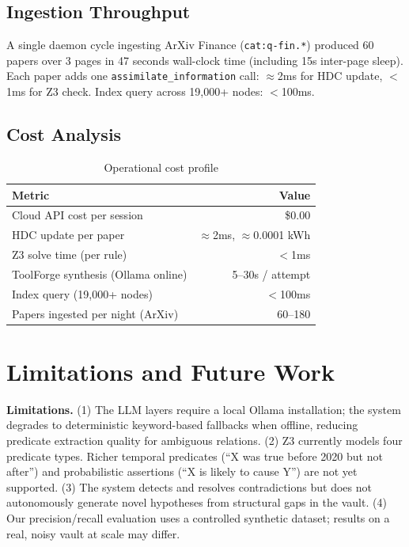 \documentclass[sigconf]{acmart}
\begin{document}
\subsection{Ingestion Throughput}

A single daemon cycle ingesting ArXiv Finance (\texttt{cat:q-fin.*}) produced 60 papers over 3 pages in 47 seconds wall-clock time (including 15s inter-page sleep). Each paper adds one \texttt{assimilate\_information} call: $\approx$2ms for HDC update, $<$1ms for Z3 check. Index query across 19,000+ nodes: $<$100ms.

\subsection{Cost Analysis}

\begin{table}[h]
\caption{Operational cost profile}
\begin{tabular}{lr}
\toprule
Metric & Value \\
\midrule
Cloud API cost per session & \$0.00 \\
HDC update per paper & $\approx$2ms, $\approx$0.0001 kWh \\
Z3 solve time (per rule) & $<$1ms \\
ToolForge synthesis (Ollama online) & 5--30s / attempt \\
Index query (19,000+ nodes) & $<$100ms \\
Papers ingested per night (ArXiv) & 60--180 \\
\bottomrule
\end{tabular}
\label{tab:cost}
\end{table}

\section{Limitations and Future Work}

\textbf{Limitations.}
(1) The LLM layers require a local Ollama installation; the system degrades to deterministic keyword-based fallbacks when offline, reducing predicate extraction quality for ambiguous relations.
(2) Z3 currently models four predicate types. Richer temporal predicates (``X was true before 2020 but not after'') and probabilistic assertions (``X is likely to cause Y'') are not yet supported.
(3) The system detects and resolves contradictions but does not autonomously generate novel hypotheses from structural gaps in the vault.
(4) Our precision/recall evaluation uses a controlled synthetic dataset; results on a real, noisy vault at scale may differ.
\end{document}
